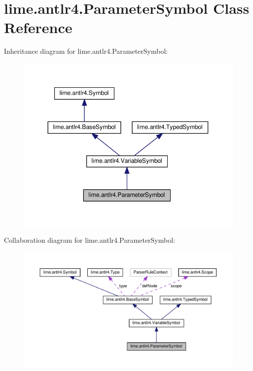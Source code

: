\hypertarget{classlime_1_1antlr4_1_1ParameterSymbol}{}\section{lime.\+antlr4.\+Parameter\+Symbol Class Reference}
\label{classlime_1_1antlr4_1_1ParameterSymbol}


Inheritance diagram for lime.\+antlr4.\+Parameter\+Symbol\+:
\nopagebreak
\begin{figure}[H]
\begin{center}
\leavevmode
\includegraphics[width=344pt]{classlime_1_1antlr4_1_1ParameterSymbol__inherit__graph}
\end{center}
\end{figure}


Collaboration diagram for lime.\+antlr4.\+Parameter\+Symbol\+:
\nopagebreak
\begin{figure}[H]
\begin{center}
\leavevmode
\includegraphics[width=350pt]{classlime_1_1antlr4_1_1ParameterSymbol__coll__graph}
\end{center}
\end{figure}
